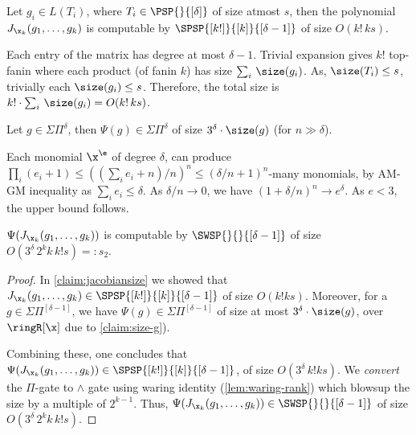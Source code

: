 \begin{claim}\label{claim:jacobiansize}
    Let $g_i \in L(T_i)$, where $T_i \in \PSP{}{[\delta]}$ of size atmost $s$, then the polynomial $J_{{\x}_k}(g_1,\hdots,g_k)$ is computable by $\SPSP{[k!]}{[k]}{[\delta-1]}$ of size $O(k!\,ks)$.
\end{claim}
    
\begin{proof-sketch}
    Each entry of the matrix has degree at most $\delta-1$. Trivial expansion gives $k!$ top-fanin where each product (of fanin $k$) has size $\sum_{i}\,\size(g_i)$. As, $\size(T_i) \le s$, trivially each $\size(g_i) \le s$. Therefore, the total size is $k! \cdot\sum_{i}\,\size(g_i)=O(k!\,ks)$.
\end{proof-sketch}
    
\begin{claim} \label{claim:size-g}
    Let $g \in \Sigma \Pi^{\delta}$, then $\Psi(g) \in \Sigma \Pi^{\delta}$ of size $3^{\delta} \cdot \size(g)$ (for $n\gg\delta$).
\end{claim}
\begin{proof-sketch}
    Each monomial $\x^{\e}$ of degree $\delta$, can produce $\prod_i (e_i+1) \le ((\sum_{i} e_i +n)/n)^n \le (\delta/n+1)^n$-many monomials, by AM-GM inequality as $\sum_{i} e_i \le \delta$. As $\delta/ n \rightarrow 0$, we have $(1+\delta/n)^n \rightarrow e^{\delta}$. As $e < 3$, the upper bound follows.
\end{proof-sketch}

\begin{lemma} \label{lem:num-size-thm2}
$\Psi(J_{{\x}_k}(g_1,\hdots,g_k))$ is computable by $\SWSP{}{}{[\delta-1]}$ of size $O(3^{\delta}\,2^kk\,k!s)=:s_2$.
\end{lemma}

\begin{proof}
    In \autoref{claim:jacobiansize} we showed that $J_{{\x}_k}(g_1,\hdots,g_k) \in \SPSP{[k!]}{[k]}{[\delta-1]}$ of size $O(k!ks)$. Moreover, for a $g \in \Sigma \Pi^{[\delta-1]}$, we have $\Psi(g) \in \Sigma \Pi^{[\delta-1]}$ of size at most $3^{\delta} \cdot \size(g)$, over $\ringR[\x]$ due to \autoref{claim:size-g}).
    
    Combining these, one concludes that $\Psi(J_{{\x}_k}(g_1,\hdots,g_k)) \in \SPSP{[k!]}{[k]}{[\delta-1]}$, of size $O(3^{\delta}\,k!ks)$. We \emph{convert} the $\Pi$-gate to $\wedge$ gate using waring identity (\autoref{lem:waring-rank}) which blowsup the size by a multiple of $2^{k-1}$. Thus, $\Psi(J_{{\x}_k}(g_1,\hdots,g_k)) \in \SWSP{}{}{[\delta-1]}$ of size $O(3^{\delta}\,2^kk\,k!s)$.
\end{proof}

